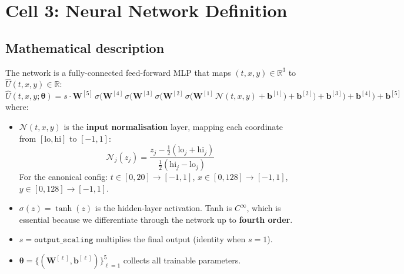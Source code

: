 \documentclass[11pt,a4paper]{article}
\begin{document}
\section{Cell 3: Neural Network Definition}
\label{sec:network}

\subsection*{Mathematical description}

The network is a fully-connected feed-forward MLP that maps
$(t,x,y) \in \mathbb{R}^3$ to $\hat{U}(t,x,y) \in \mathbb{R}$:
\begin{equation}
  \hat{U}(t,x,y;\bm{\theta})
  = s \cdot \bm{W}^{[5]}\,\sigma\!\bigl(
      \bm{W}^{[4]}\,\sigma\!\bigl(
        \bm{W}^{[3]}\,\sigma\!\bigl(
          \bm{W}^{[2]}\,\sigma\!\bigl(
            \bm{W}^{[1]}\,\mathcal{N}(t,x,y)
            + \bm{b}^{[1]}
          \bigr) + \bm{b}^{[2]}
        \bigr) + \bm{b}^{[3]}
      \bigr) + \bm{b}^{[4]}
    \bigr) + \bm{b}^{[5]}
\label{eq:mlp}
\end{equation}
where:
\begin{itemize}[nosep]
  \item $\mathcal{N}(t,x,y)$ is the \textbf{input normalisation}
        layer, mapping each coordinate from $[\text{lo},\text{hi}]$
        to $[-1,1]$:
        \[
          \mathcal{N}_j(z_j) = \frac{z_j - \tfrac{1}{2}(\text{lo}_j + \text{hi}_j)}
                                    {\tfrac{1}{2}(\text{hi}_j - \text{lo}_j)}
        \]
        For the canonical config:
        $t \in [0,20] \to [-1,1]$,
        $x \in [0,128] \to [-1,1]$,
        $y \in [0,128] \to [-1,1]$.

  \item $\sigma(z) = \tanh(z)$ is the hidden-layer activation.
        Tanh is $C^{\infty}$, which is essential because we
        differentiate through the network up to \textbf{fourth order}.

  \item $s = \texttt{output\_scaling}$ multiplies the final output
        (identity when $s=1$).

  \item $\bm{\theta} = \{(\bm{W}^{[\ell]},\bm{b}^{[\ell]})\}_{\ell=1}^{5}$
        collects all trainable parameters.
\end{itemize}
\end{document}

